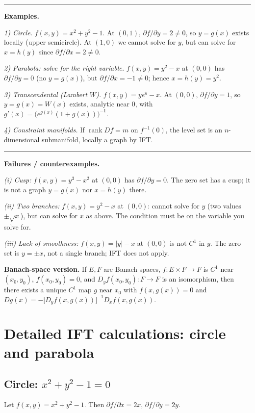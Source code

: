 \documentclass[12pt,a4paper]{article}
\theoremstyle{plain}
\theoremstyle{definition}
\theoremstyle{remark}
\theoremstyle{remark}
\newcommand{\sep}{\vspace{6pt}\hrule\vspace{8pt}}
\begin{document}
	\sep
	
	\textbf{Examples.}
	
	\emph{1) Circle.} $f(x,y)=x^2+y^2-1$. At $(0,1)$, $\partial f/\partial y=2\ne0$,
	so $y=g(x)$ exists locally (upper semicircle). At $(1,0)$ we cannot solve for $y$,
	but can solve for $x=h(y)$ since $\partial f/\partial x=2\ne0$.
	
	\emph{2) Parabola: solve for the right variable.}
	$f(x,y)=y^2-x$ at $(0,0)$ has $\partial f/\partial y=0$ (no $y=g(x)$),
	but $\partial f/\partial x=-1\ne0$; hence $x=h(y)=y^2$.
	
	\emph{3) Transcendental (Lambert $W$).}
	$f(x,y)=y e^y - x$. At $(0,0)$, $\partial f/\partial y=1$, so $y=g(x)=W(x)$ exists,
	analytic near $0$, with $g'(x)=\big(e^{g(x)}(1+g(x))\big)^{-1}$.
	
	\emph{4) Constraint manifolds.}
	If $\operatorname{rank} Df = m$ on $f^{-1}(0)$, the level set is an $n$-dimensional submanifold,
	locally a graph by IFT.
	
	\sep
	
	\textbf{Failures / counterexamples.}
	
	\emph{(i) Cusp:} $f(x,y)=y^3-x^2$ at $(0,0)$ has $\partial f/\partial y=0$.
	The zero set has a cusp; it is not a graph $y=g(x)$ nor $x=h(y)$ there.
	
	\emph{(ii) Two branches:} $f(x,y)=y^2-x$ at $(0,0)$: cannot solve for $y$ (two values
	$\pm\sqrt{x}$), but can solve for $x$ as above. The condition must be on the variable you
	solve for.
	
	\emph{(iii) Lack of smoothness:} $f(x,y)=|y|-x$ at $(0,0)$ is not $C^1$ in $y$.
	The zero set is $y=\pm x$, not a single branch; IFT does not apply.
	
	\medskip
	\textbf{Banach-space version.}
	If $E,F$ are Banach spaces, $f:E\times F\to F$ is $C^1$ near $(x_0,y_0)$,
	$f(x_0,y_0)=0$, and $D_y f(x_0,y_0):F\to F$ is an isomorphism, then there exists a unique
	$C^1$ map $g$ near $x_0$ with $f(x,g(x))=0$ and
	$Dg(x)= -\big[D_y f(x,g(x))\big]^{-1} D_x f(x,g(x))$.
	
	\section*{Detailed IFT calculations: circle and parabola}
	
	\subsection*{Circle: $x^2+y^2-1=0$}
	Let $f(x,y)=x^2+y^2-1$. Then $\partial f/\partial x=2x$, $\partial f/\partial y=2y$.
	
\end{document}
